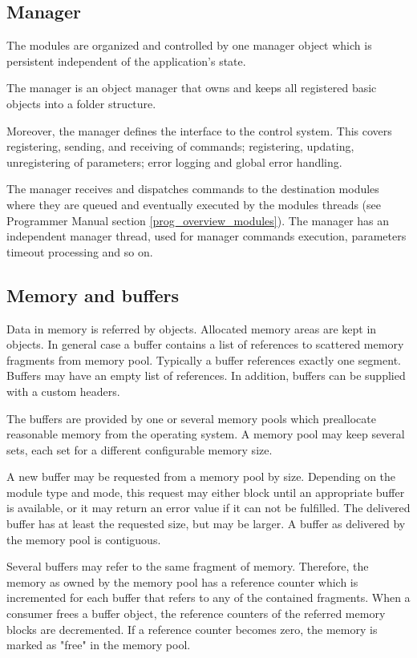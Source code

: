 \subsection{Manager}
The modules are organized and controlled by one manager object
which is persistent independent of the application's state.

The manager is an object manager that owns and keeps all 
registered basic objects into a folder structure. 

Moreover, the manager defines the interface to the control system. 
This covers registering, sending, and receiving of commands; registering, 
updating, unregistering of parameters; error logging and global error handling. 

The manager receives and dispatches commands 
to the destination modules where they are queued and eventually executed 
by the modules threads (see Programmer Manual section \ref{prog_overview_modules}).
The manager has an independent manager thread, used for 
manager commands execution, parameters timeout processing and so on. 
 
\subsection{Memory and buffers}
Data in memory is referred by   objects. 
Allocated memory areas are kept in 
 objects. 
In general case a buffer contains a list of references to scattered memory 
fragments from memory pool. Typically a buffer references exactly one segment.
Buffers may have an empty list of references. In addition, buffers can be supplied
with a custom headers.
 
The buffers are provided by one or several memory pools 
which preallocate reasonable memory from the operating system. 
A memory pool may keep several sets, each set for a different 
configurable memory size.

A new buffer may be requested from a memory pool by size. 
Depending on the module type and mode, this request may either block until an 
appropriate buffer is available, or it may return an error value 
if it can not be fulfilled. The delivered buffer has at 
least the requested size, but may be larger. A buffer as 
delivered by the memory pool is contiguous. 

Several buffers may refer to the same fragment of memory. 
Therefore, the memory as owned by the memory pool has a 
reference counter which is incremented for each buffer 
that refers to any of the contained fragments. When a consumer frees 
a buffer object, the reference counters of the referred 
memory blocks are decremented. If a reference counter becomes 
zero, the memory is marked as "free" in the memory pool.

